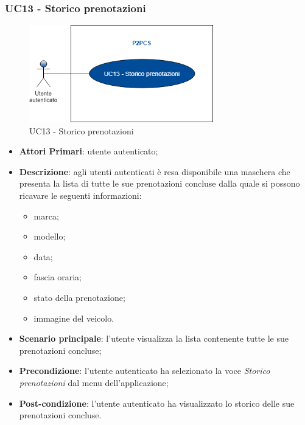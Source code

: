 \subsubsection{UC13 - Storico prenotazioni}
 \begin{figure}[h]
	\includegraphics[width=8cm]{res/images/Schemagenerale4.png}
	\centering
	\caption{UC13 - Storico prenotazioni}
\end{figure}
\begin{itemize}
	\item \textbf{Attori Primari}: utente autenticato;
	\item \textbf{Descrizione}: agli utenti autenticati è resa disponibile una maschera che presenta la lista di tutte le sue prenotazioni concluse dalla quale si possono ricavare le seguenti informazioni:
	\begin{itemize}
		\item marca;
		\item modello;
		\item data;
		\item fascia oraria;
		\item stato della prenotazione;
		\item immagine del veicolo.
	\end{itemize} 
	\item \textbf{Scenario principale}: l'utente visualizza la lista contenente tutte le sue prenotazioni concluse;
	\item \textbf{Precondizione}: l'utente autenticato ha selezionato la voce \textit{Storico prenotazioni} dal menu dell'applicazione;
	\item \textbf{Post-condizione}: l'utente autenticato ha visualizzato lo storico delle sue prenotazioni concluse. 
\end{itemize} 
